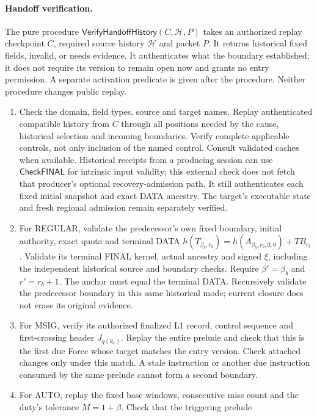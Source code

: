 \documentclass[11pt,a4paper]{article}
\newcommand{\TB}{\mathit{TB}}
\newcommand{\tagg}[1]{\ensuremath{\mathsf{#1}}}
\begin{document}
\paragraph{Handoff verification.}
\label{sec:verify-handoff}
The pure procedure $\tagg{VerifyHandoffHistory}(C,\mathcal H,P)$ takes an
authorized replay checkpoint $C$, required source history $\mathcal H$
and packet $P$. It returns historical fixed fields, invalid, or needs
evidence. It authenticates what the boundary established; it does not
require its version to remain open now and grants no entry permission.
A separate activation predicate is given after the procedure. Neither
procedure changes public replay.
\begin{enumerate}[label=(\roman*),itemsep=2pt]
\item Check the domain, field types, source and target names. Replay
authenticated compatible history from $C$ through all positions
needed by the cause, historical selection and incoming boundaries.
Verify complete applicable controls, not only inclusion of the named
control. Consult validated caches when available. Historical receipts
from a producing session can use \tagg{CheckFINAL} for intrinsic input
validity; this external check does not fetch that producer's optional
recovery-admission path. It still authenticates each fixed initial
snapshot and exact DATA ancestry. The target's executable state and
fresh regional admission remain separately verified.
\item For REGULAR, validate the predecessor's own fixed boundary,
initial authority, exact quota and terminal DATA
$h(T_{\beta_b,r_b})=h(A_{\beta_b,r_b,0,0})+\TB_{r_b}$.
Validate its terminal FINAL kernel, actual ancestry and signed $\xi$,
including the independent historical source and boundary checks.
Require $\beta'=\beta_b$ and $r'=r_b+1$. The anchor must equal the
terminal DATA. Recursively validate the predecessor boundary in this same
historical mode; current closure does not erase its original evidence.
\item For MSIG, verify its authorized finalized L1 record, control
sequence and first-crossing header $J_{q(\theta_a)}$. Replay the
entire prelude and check that this is the first due Force whose target
matches the entry version. Check attached changes only under this
match. A stale instruction or another due instruction consumed by the
same prelude cannot form a second boundary.
\item For AUTO, replay the fixed base windows, consecutive miss count
and the duty's tolerance $M=1+\beta$. Check that the triggering prelude

\end{enumerate}
\end{document}
